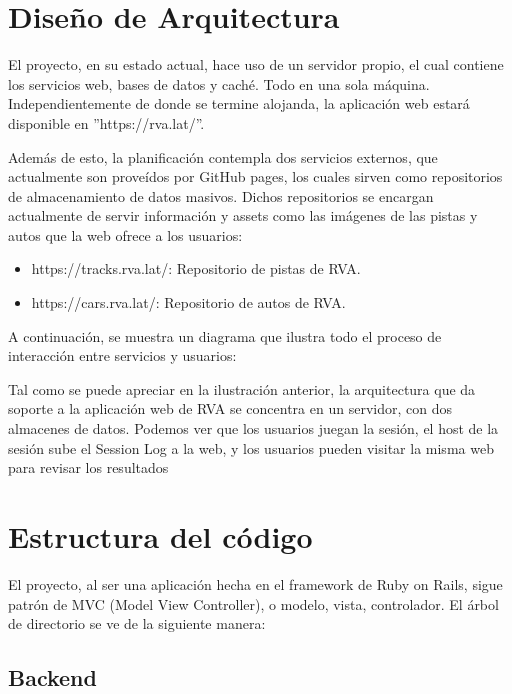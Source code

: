 \section{Diseño de Arquitectura}
El proyecto, en su estado actual, hace uso de un servidor propio, el cual contiene los servicios web, bases de datos y caché. Todo en una sola máquina. Independientemente de donde se termine alojanda, la aplicación web estará disponible en ''https://rva.lat/''.

Además de esto, la planificación contempla dos servicios externos, que actualmente son proveídos por GitHub pages, los cuales sirven como repositorios de almacenamiento de datos masivos. Dichos repositorios se encargan actualmente de servir información y assets como las imágenes de las pistas y autos que la web ofrece a los usuarios:

\begin{itemize}
	\item https://tracks.rva.lat/: Repositorio de pistas de RVA.
	\item https://cars.rva.lat/: Repositorio de autos de RVA.
\end{itemize}

A continuación, se muestra un diagrama que ilustra todo el proceso de interacción entre servicios y usuarios:

Tal como se puede apreciar en la ilustración anterior, la arquitectura que da soporte a la aplicación web de RVA se concentra en un servidor, con dos almacenes de datos. Podemos ver que los usuarios juegan la sesión, el host de la sesión sube el Session Log a la web, y los usuarios pueden visitar la misma web para revisar los resultados

\section{Estructura del código}
El proyecto, al ser una aplicación hecha en el framework de Ruby on Rails, sigue patrón de MVC (Model View Controller), o modelo, vista, controlador. El árbol de directorio se ve de la siguiente manera:




\subsection{Backend}

